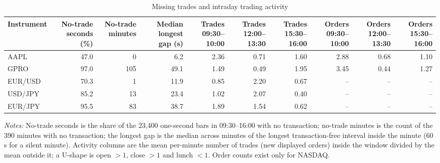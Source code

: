 \begin{table}[htbp]
\centering
\caption{Missing trades and intraday trading activity}
\label{tab:missing_trades_activity}
\footnotesize
\begin{tabular}{lrrrrrrrrr}
\toprule
Instrument & No-trade seconds (\%) & No-trade minutes & Median longest gap (s) & Trades 09:30--10:00 & Trades 12:00--13:30 & Trades 15:30--16:00 & Orders 09:30--10:00 & Orders 12:00--13:30 & Orders 15:30--16:00 \\
\midrule
AAPL & 47.0 & 0 & 6.2 & 2.36 & 0.71 & 1.60 & 2.88 & 0.68 & 1.10 \\
GPRO & 97.0 & 105 & 49.1 & 1.49 & 0.49 & 1.95 & 3.45 & 0.44 & 1.27 \\
EUR/USD & 70.3 & 1 & 11.9 & 0.85 & 2.20 & 0.67 & -- & -- & -- \\
USD/JPY & 85.2 & 13 & 23.4 & 1.02 & 2.07 & 0.40 & -- & -- & -- \\
EUR/JPY & 95.5 & 83 & 38.7 & 1.89 & 1.54 & 0.62 & -- & -- & -- \\
\bottomrule
\end{tabular}

\begin{minipage}{0.95\linewidth}\footnotesize\emph{Notes:} No-trade seconds is the share of the 23,400 one-second bars in 09:30--16:00 with no transaction; no-trade minutes is the count of the 390 minutes with no transaction; the longest gap is the median across minutes of the longest transaction-free interval inside the minute (60 s for a silent minute). Activity columns are the mean per-minute number of trades (new displayed orders) inside the window divided by the mean outside it; a U-shape is open $>1$, close $>1$ and lunch $<1$. Order counts exist only for NASDAQ.\end{minipage}
\end{table}

